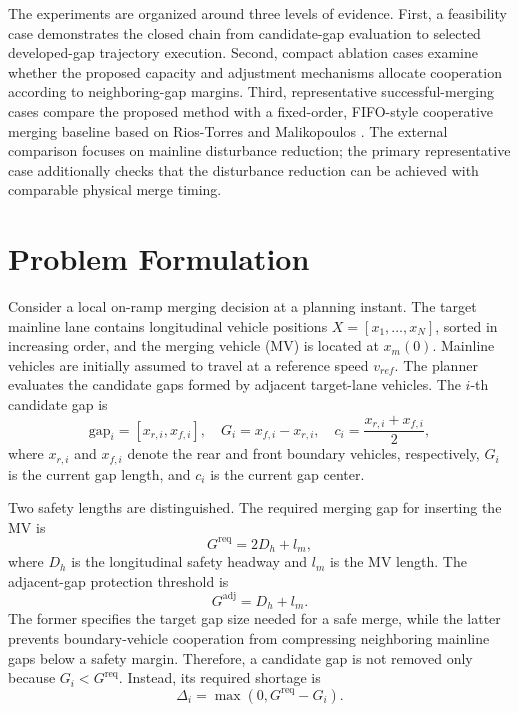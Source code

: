 \documentclass[conference]{IEEEtran}
\begin{document}
The experiments are organized around three levels of evidence. First, a
feasibility case demonstrates the closed chain from candidate-gap evaluation to
selected developed-gap trajectory execution. Second, compact ablation cases
examine whether the proposed capacity and adjustment mechanisms allocate
cooperation according to neighboring-gap margins. Third, representative
successful-merging cases compare the proposed method with a fixed-order,
FIFO-style cooperative merging baseline based on Rios-Torres and Malikopoulos
\cite{riosTorres2017automated}. The external comparison focuses on mainline
disturbance reduction; the primary representative case additionally checks that
the disturbance reduction can be achieved with comparable physical merge timing.

\section{Problem Formulation}
Consider a local on-ramp merging decision at a planning instant. The target
mainline lane contains longitudinal vehicle positions
\(X=[x_1,\ldots,x_N]\), sorted in increasing order, and the merging vehicle
(MV) is located at \(x_m(0)\). Mainline vehicles are initially assumed to travel
at a reference speed \(v_{ref}\). The planner evaluates the candidate gaps
formed by adjacent target-lane vehicles. The \(i\)-th candidate gap is
\begin{equation}
    \mathrm{gap}_i=[x_{r,i},x_{f,i}],\quad
    G_i=x_{f,i}-x_{r,i},\quad
    c_i=\frac{x_{r,i}+x_{f,i}}{2},
    \label{eq:gap_definition}
\end{equation}
where \(x_{r,i}\) and \(x_{f,i}\) denote the rear and front boundary vehicles,
respectively, \(G_i\) is the current gap length, and \(c_i\) is the current
gap center.

Two safety lengths are distinguished. The required merging gap for inserting
the MV is
\begin{equation}
    G^{\mathrm{req}}=2D_h+l_m,
    \label{eq:required_gap}
\end{equation}
where \(D_h\) is the longitudinal safety headway and \(l_m\) is the MV length.
The adjacent-gap protection threshold is
\begin{equation}
    G^{\mathrm{adj}}=D_h+l_m.
    \label{eq:adjacent_gap}
\end{equation}
The former specifies the target gap size needed for a safe merge, while the
latter prevents boundary-vehicle cooperation from compressing neighboring
mainline gaps below a safety margin. Therefore, a candidate gap is not removed
only because \(G_i<G^{\mathrm{req}}\). Instead, its required shortage is
\begin{equation}
    \Delta_i=\max(0,G^{\mathrm{req}}-G_i).
    \label{eq:gap_shortage}
\end{equation}
\end{document}
